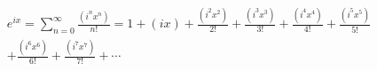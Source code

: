 \documentclass[preview]{standalone}
\begin{document}
\begin{align*}
e^{ix} = \sum_{n=0}^{\infty} \frac{(i^nx^n)}{n!} = 1 + (ix) + \frac{(i^2x^2)}{2!} + \frac{(i^3x^3)}{3!} + \frac{(i^4x^4)}{4!} + \frac{(i^5x^5)}{5!} \\ + \frac{(i^6x^6)}{6!} + \frac{(i^7x^7)}{7!} + \cdots
\end{align*}
\end{document}

